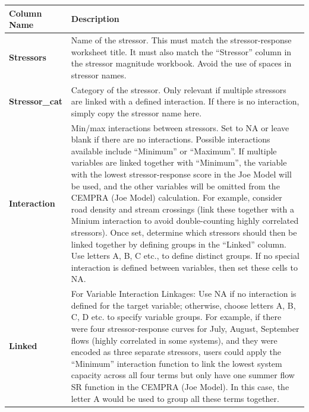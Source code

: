 \documentclass[
  letterpaper,
  DIV=11,
  numbers=noendperiod]{scrreprt}
\begin{document}
\begin{longtable}[]{@{}
  >{\raggedright\arraybackslash}p{}
  >{\raggedright\arraybackslash}p{}@{}}
\toprule\noalign{}
\begin{minipage}[b]{\linewidth}\raggedright
Column Name
\end{minipage} & \begin{minipage}[b]{\linewidth}\raggedright
Description
\end{minipage} \\
\midrule\noalign{}
\endhead
\bottomrule\noalign{}
\endlastfoot
\textbf{Stressors} & Name of the stressor. This must match the
stressor-response worksheet title. It must also match the ``Stressor''
column in the stressor magnitude workbook. Avoid the use of spaces in
stressor names. \\
\textbf{Stressor\_cat} & Category of the stressor. Only relevant if
multiple stressors are linked with a defined interaction. If there is no
interaction, simply copy the stressor name here. \\
\textbf{Interaction} & Min/max interactions between stressors. Set to NA
or leave blank if there are no interactions. Possible interactions
available include ``Minimum'' or ``Maximum''. If multiple variables are
linked together with ``Minimum'', the variable with the lowest
stressor-response score in the Joe Model will be used, and the other
variables will be omitted from the CEMPRA (Joe Model) calculation. For
example, consider road density and stream crossings (link these together
with a Minium interaction to avoid double-counting highly correlated
stressors). Once set, determine which stressors should then be linked
together by defining groups in the ``Linked'' column. Use letters A, B,
C etc., to define distinct groups. If no special interaction is defined
between variables, then set these cells to NA. \\
\textbf{Linked} & For Variable Interaction Linkages: Use NA if no
interaction is defined for the target variable; otherwise, choose
letters A, B, C, D etc. to specify variable groups. For example, if
there were four stressor-response curves for July, August, September
flows (highly correlated in some systems), and they were encoded as
three separate stressors, users could apply the ``Minimum'' interaction
function to link the lowest system capacity across all four terms but
only have one summer flow SR function in the CEMPRA (Joe Model). In this
case, the letter A would be used to group all these terms together. \\

\end{longtable}
\end{document}
